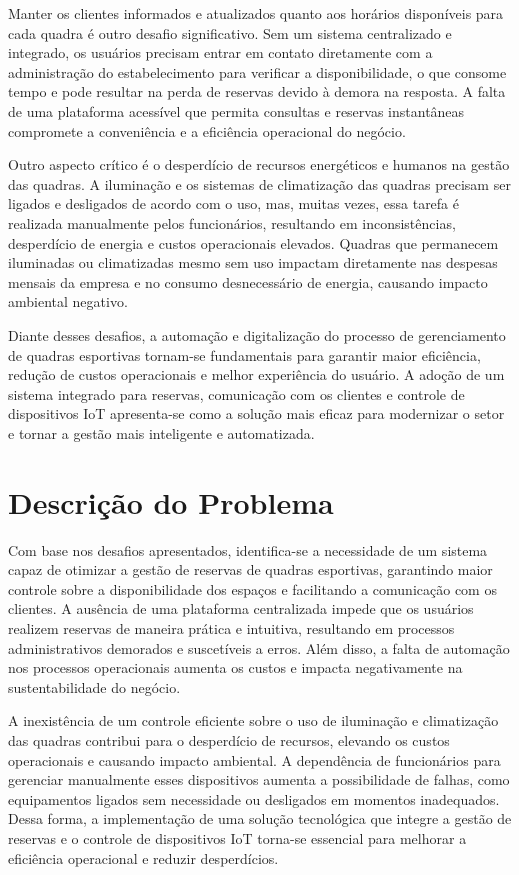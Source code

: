 Manter os clientes informados e atualizados quanto aos horários disponíveis para cada quadra é outro desafio significativo. Sem um sistema centralizado e integrado, os usuários precisam entrar em contato diretamente com a administração do estabelecimento para verificar a disponibilidade, o que consome tempo e pode resultar na perda de reservas devido à demora na resposta. A falta de uma plataforma acessível que permita consultas e reservas instantâneas compromete a conveniência e a eficiência operacional do negócio.

Outro aspecto crítico é o desperdício de recursos energéticos e humanos na gestão das quadras. A iluminação e os sistemas de climatização das quadras precisam ser ligados e desligados de acordo com o uso, mas, muitas vezes, essa tarefa é realizada manualmente pelos funcionários, resultando em inconsistências, desperdício de energia e custos operacionais elevados. Quadras que permanecem iluminadas ou climatizadas mesmo sem uso impactam diretamente nas despesas mensais da empresa e no consumo desnecessário de energia, causando impacto ambiental negativo.

Diante desses desafios, a automação e digitalização do processo de gerenciamento de quadras esportivas tornam-se fundamentais para garantir maior eficiência, redução de custos operacionais e melhor experiência do usuário. A adoção de um sistema integrado para reservas, comunicação com os clientes e controle de dispositivos IoT apresenta-se como a solução mais eficaz para modernizar o setor e tornar a gestão mais inteligente e automatizada.

\section{Descrição do Problema}

Com base nos desafios apresentados, identifica-se a necessidade de um sistema capaz de otimizar a gestão de reservas de quadras esportivas, garantindo maior controle sobre a disponibilidade dos espaços e facilitando a comunicação com os clientes. A ausência de uma plataforma centralizada impede que os usuários realizem reservas de maneira prática e intuitiva, resultando em processos administrativos demorados e suscetíveis a erros. Além disso, a falta de automação nos processos operacionais aumenta os custos e impacta negativamente na sustentabilidade do negócio.

A inexistência de um controle eficiente sobre o uso de iluminação e climatização das quadras contribui para o desperdício de recursos, elevando os custos operacionais e causando impacto ambiental. A dependência de funcionários para gerenciar manualmente esses dispositivos aumenta a possibilidade de falhas, como equipamentos ligados sem necessidade ou desligados em momentos inadequados. Dessa forma, a implementação de uma solução tecnológica que integre a gestão de reservas e o controle de dispositivos IoT torna-se essencial para melhorar a eficiência operacional e reduzir desperdícios.

